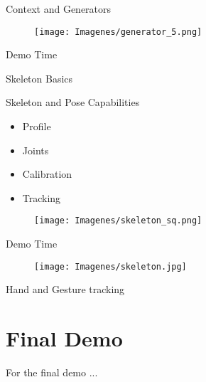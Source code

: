 \documentclass[bigger]{beamer}
\begin{document}
\begin{frame}{\ECFAugie Context and Generators}
\begin{figure}[h]
		\texttt{[image: Imagenes/generator\_5.png]}
\end{figure}
\end{frame}

\begin{frame}[fragile]{\ECFAugie Demo Time}
\begin{center}
\end{center}
\end{frame}

\begin{frame}{\ECFAugie Skeleton Basics}
\begin{minipage}{0.3\textwidth}
Skeleton and Pose Capabilities
\begin{itemize}
	\item Profile
	\item Joints
	\item Calibration
	\item Tracking
\end{itemize}
\end{minipage}
\begin{minipage}{0.45\textwidth}
\begin{figure}[h]
		\texttt{[image: Imagenes/skeleton\_sq.png]}
\end{figure}
\end{minipage}

\end{frame}

\begin{frame}{\ECFAugie Demo Time}
\begin{figure}[h]
		\texttt{[image: Imagenes/skeleton.jpg]}
\end{figure}
\end{frame}

\begin{frame}{\ECFAugie Hand and Gesture tracking}
\end{frame}


\section{Final Demo}
\begin{frame}{\ECFAugie For the final demo ...}
\end{frame}
\end{document}
